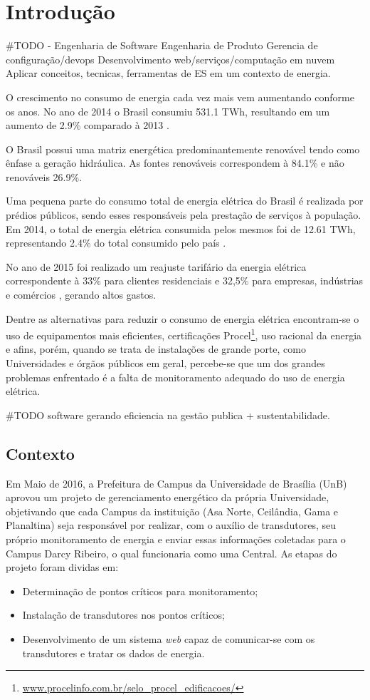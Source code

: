 \chapter{Introdução}
\#TODO - Engenharia de Software
Engenharia de Produto
Gerencia de configuração/devops
Desenvolvimento web/serviços/computação em nuvem
Aplicar conceitos, tecnicas, ferramentas de ES em um contexto de energia.

O crescimento no consumo de energia cada vez mais vem aumentando conforme os anos. No
ano de 2014 o Brasil consumiu 531.1 TWh, resultando em um aumento de 2.9\% comparado à 2013 \cite{balanco_energetico}.

O Brasil possui uma matriz energética predominantemente renovável tendo como ênfase a geração hidráulica. As fontes renováveis correspondem à 84.1\% e não renováveis 26.9\%.

Uma pequena parte do consumo total de energia elétrica do Brasil é realizada por prédios públicos, sendo
esses responsáveis pela prestação de serviços à população. Em 2014, o total de energia elétrica consumida
pelos mesmos foi de 12.61 TWh, representando 2.4\% do total consumido pelo país \cite{balanco_energetico}.

No ano de 2015 foi realizado um reajuste tarifário da energia elétrica correspondente à 33\% para clientes residenciais e 32,5\% para empresas, indústrias e comércios \cite{aumento_energia}, gerando altos gastos.

Dentre as alternativas para reduzir o consumo de energia elétrica encontram-se o uso de equipamentos mais eficientes, certificações Procel\footnote{\url{www.procelinfo.com.br/selo_procel_edificacoes/}}, uso racional da energia e afins, porém, quando se trata de instalações de grande porte, como Universidades e órgãos públicos em geral, percebe-se que um dos grandes problemas enfrentado é a falta de monitoramento adequado do uso de energia elétrica.

\#TODO software gerando eficiencia na gestão publica + sustentabilidade.

\section{Contexto}
Em Maio de 2016, a Prefeitura de Campus da Universidade de Brasília (UnB) aprovou um projeto de gerenciamento energético da própria Universidade, objetivando que cada Campus da instituição (Asa Norte, Ceilândia, Gama e Planaltina) seja responsável por realizar, com o auxílio de transdutores, seu próprio monitoramento de energia e enviar essas informações coletadas para o Campus Darcy Ribeiro, o qual funcionaria como uma Central. As etapas do projeto foram dividas em:
\begin{itemize}
    \item Determinação de pontos críticos para monitoramento;
    \item Instalação de transdutores nos pontos críticos;
    \item Desenvolvimento de um sistema \textit{web} capaz de comunicar-se com os transdutores e tratar os dados de energia.
\end{itemize}


